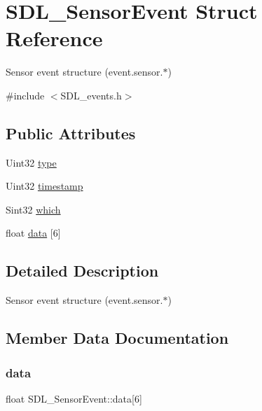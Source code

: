 \hypertarget{struct_s_d_l___sensor_event}{}\section{S\+D\+L\+\_\+\+Sensor\+Event Struct Reference}
\label{struct_s_d_l___sensor_event}


Sensor event structure (event.\+sensor.$\ast$)  




{\ttfamily \#include $<$S\+D\+L\+\_\+events.\+h$>$}

\subsection*{Public Attributes}
\begin{DoxyCompactItemize}
\item 
Uint32 \mbox{\hyperlink{struct_s_d_l___sensor_event_a0173d64fbe5299cad956298faf3fb0f9}{type}}
\item 
Uint32 \mbox{\hyperlink{struct_s_d_l___sensor_event_a7de6c2b4d4791f5553b5de225293ceb5}{timestamp}}
\item 
Sint32 \mbox{\hyperlink{struct_s_d_l___sensor_event_aa1c130192bad9b316f811f2d138b3b22}{which}}
\item 
float \mbox{\hyperlink{struct_s_d_l___sensor_event_ab08c166baa755f66b13df0d66ed6d29b}{data}} \mbox{[}6\mbox{]}
\end{DoxyCompactItemize}


\subsection{Detailed Description}
Sensor event structure (event.\+sensor.$\ast$) 

\subsection{Member Data Documentation}
\mbox{\label{struct_s_d_l___sensor_event_ab08c166baa755f66b13df0d66ed6d29b}} 
\subsubsection{\texorpdfstring{data}{data}}
{\footnotesize\ttfamily float S\+D\+L\+\_\+\+Sensor\+Event\+::data\mbox{[}6\mbox{]}}


